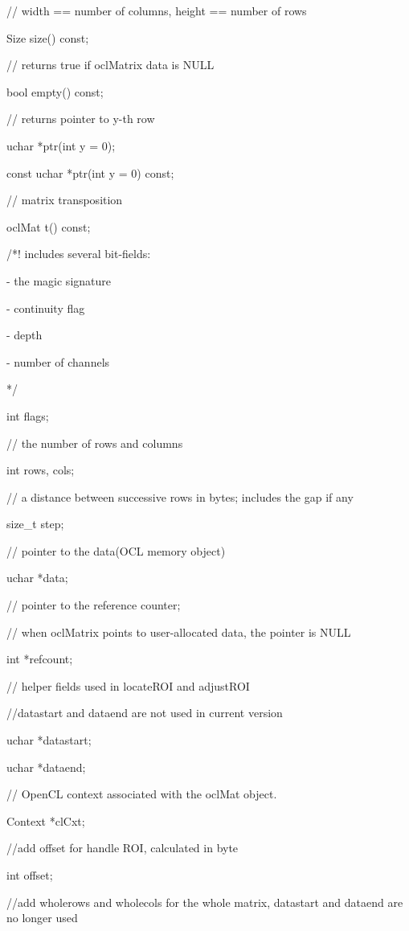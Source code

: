 \documentclass{article}
\begin{document}
     // width == number of columns, height == number of rows

     Size size() const;

     // returns true if oclMatrix data is NULL

     bool empty() const;


     // returns pointer to y-th row

     uchar *ptr(int y = 0);

     const uchar *ptr(int y = 0) const;





     // matrix transposition

     oclMat t() const;


     /*! includes several bit-fields:

        - the magic signature

        - continuity flag

        - depth

        - number of channels

     */

     int flags;

     // the number of rows and columns

     int rows, cols;

     // a distance between successive rows in bytes; includes the gap if any

     size\_t step;

     // pointer to the data(OCL memory object)

     uchar *data;


     // pointer to the reference counter;

     // when oclMatrix points to user-allocated data, the pointer is NULL

     int *refcount;


     // helper fields used in locateROI and adjustROI

     //datastart and dataend are not used in current version

     uchar *datastart;

     uchar *dataend;


     // OpenCL context associated with the oclMat object.

     Context *clCxt;

     //add offset for handle ROI, calculated in byte

     int offset;

     //add wholerows and wholecols for the whole matrix, datastart and dataend are no longer used
\end{document}
